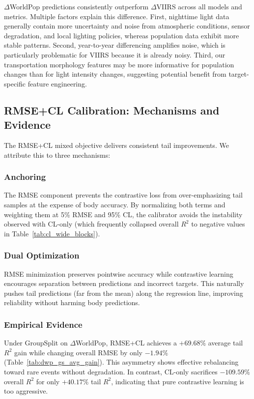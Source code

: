 \documentclass[pdflatex,sn-basic,Numbered]{sn-jnl}
\begin{document}
$\Delta$WorldPop predictions consistently outperform $\Delta$VIIRS across all models and metrics. Multiple factors explain this difference. First, nighttime light data generally contain more uncertainty and noise from atmospheric conditions, sensor degradation, and local lighting policies, whereas population data exhibit more stable patterns. Second, year-to-year differencing amplifies noise, which is particularly problematic for VIIRS because it is already noisy. Third, our transportation morphology features may be more informative for population changes than for light intensity changes, suggesting potential benefit from target-specific feature engineering.

\subsection{RMSE+CL Calibration: Mechanisms and Evidence}

The RMSE+CL mixed objective delivers consistent tail improvements. We attribute this to three mechanisms:

\subsubsection{Anchoring}
The RMSE component prevents the contrastive loss from over-emphasizing tail samples at the expense of body accuracy. By normalizing both terms and weighting them at 5\% RMSE and 95\% CL, the calibrator avoids the instability observed with CL-only (which frequently collapsed overall $R^2$ to negative values in Table~\ref{tab:cl_wide_blocks}).

\subsubsection{Dual Optimization}
RMSE minimization preserves pointwise accuracy while contrastive learning encourages separation between predictions and incorrect targets. This naturally pushes tail predictions (far from the mean) along the regression line, improving reliability without harming body predictions.

\subsubsection{Empirical Evidence}
Under GroupSplit on $\Delta$WorldPop, RMSE+CL achieves a $+69.68\%$ average tail $R^2$ gain while changing overall RMSE by only $-1.94\%$ (Table~\ref{tab:dwp_gs_avg_gain}). This asymmetry shows effective rebalancing toward rare events without degradation. In contrast, CL-only sacrifices $-109.59\%$ overall $R^2$ for only $+40.17\%$ tail $R^2$, indicating that pure contrastive learning is too aggressive.
\end{document}

